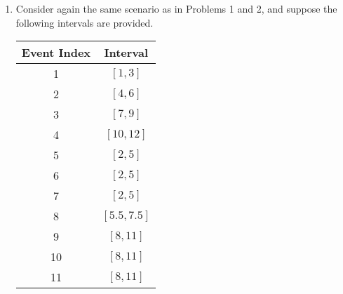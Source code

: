 \documentclass[12pt]{article}
\theoremstyle{remark}
\newtheorem*{solution}{Solution}
\begin{document}
\begin{enumerate}
\begin{enumerate}[label=(\alph*)]
\begin{solution}
$\newline \texttt{[image: Graph2]} \newline$ (copied down here for convenience) $\newline \newline$ Events 1,2,3 are 9 long, which means they have lower priority than the small 4 and 5 following the graph. $\newline$ Events 4 and 5, as the shortest non-overlapping events, are added first. These then, however, block events 1,2, and 3 from entering due overlap $\newline \newline$ Due to our algorithm, only 2 events (4,5) will be picked by size, which is less optimal than the most optimal 3 (being 1 [1-10],2 [11-20],3 [21-30])
\end{solution}

\end{enumerate}

\newpage
\item Consider again the same scenario as in Problems 1 and 2, and suppose the following intervals are provided.
\begin{center}
\begin{tabular}{c|c}
Event Index & Interval \\ \hline
1 & $[1, 3]$ \\ 
2 & $[4, 6]$ \\
3 & $[7, 9]$ \\
4 & $[10, 12]$ \\
5 & $[2, 5]$ \\
6 & $[2, 5]$ \\
7 & $[2, 5]$ \\
8 & $[5.5, 7.5]$ \\
9 & $[8, 11]$ \\
10 & $[8, 11]$ \\
11 & $[8, 11]$ \\
\end{tabular}
\end{center}


\end{enumerate}
\end{document}
